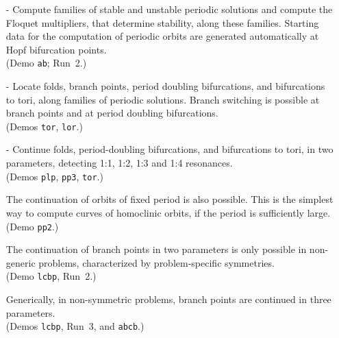 \documentclass[12pt]{report}
\begin{document}
\begin{itemize}
\item[-]
  Compute families of stable and unstable periodic
  solutions and
  compute the Floquet multipliers, that determine stability, along
  these families.
  Starting data for the computation of periodic orbits are
  generated automatically at Hopf bifurcation points. \\
  (Demo {\tt ab}; Run~2.)
\item[-]
  Locate folds, branch points, period doubling bifurcations,
  and bifurcations to tori, along families of periodic solutions. 
  Branch switching is possible at branch points and at period 
  doubling bifurcations.  \\
  (Demos {\tt tor}, {\tt lor}.)
\item[-]  Continue folds, period-doubling bifurcations,
  and bifurcations to tori, in two parameters, detecting
  1:1, 1:2, 1:3 and 1:4 resonances. \\
  (Demos {\tt plp}, {\tt pp3}, {\tt tor}.)

  The continuation of orbits of fixed period is also
  possible. This is the simplest way to compute curves of
  homoclinic orbits, if the period is sufficiently large. \\
  (Demo {\tt pp2}.)

  The continuation of branch points in two parameters is only possible
  in non-generic problems, characterized by problem-specific symmetries.\\
  (Demo {\tt lcbp}, Run~2.)

  Generically, in non-symmetric problems, branch points are continued
  in three parameters.\\
  (Demos {\tt lcbp}, Run~3, and {\tt abcb}.)


\end{itemize}
\end{document}
